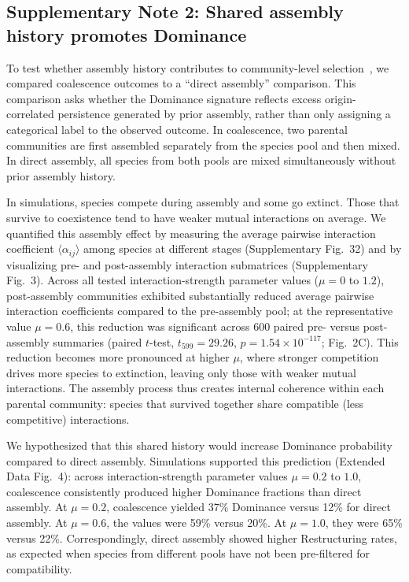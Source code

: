 \subsection*{Supplementary Note 2: Shared assembly history promotes Dominance}
\label{sec:suppl:note2}

To test whether assembly history contributes to community-level selection~\citep{Gilpin1994,Debray2022,Tikhonov2016,DiazColunga2022}, we compared coalescence outcomes to a ``direct assembly'' comparison. This comparison asks whether the Dominance signature reflects excess origin-correlated persistence generated by prior assembly, rather than only assigning a categorical label to the observed outcome. In coalescence, two parental communities are first assembled separately from the species pool and then mixed. In direct assembly, all species from both pools are mixed simultaneously without prior assembly history.

In simulations, species compete during assembly and some go extinct. Those that survive to coexistence tend to have weaker mutual interactions on average. We quantified this assembly effect by measuring the average pairwise interaction coefficient $\langle \alpha_{ij} \rangle$ among species at different stages (Supplementary Fig.~32) and by visualizing pre- and post-assembly interaction submatrices (Supplementary Fig.~3). Across all tested interaction-strength parameter values ($\mu = 0$ to $1.2$), post-assembly communities exhibited substantially reduced average pairwise interaction coefficients compared to the pre-assembly pool; at the representative value $\mu = 0.6$, this reduction was significant across 600 paired pre- versus post-assembly summaries (paired $t$-test, $t_{599} = 29.26$, $p = 1.54 \times 10^{-117}$; Fig.~2C). This reduction becomes more pronounced at higher $\mu$, where stronger competition drives more species to extinction, leaving only those with weaker mutual interactions. The assembly process thus creates internal coherence within each parental community: species that survived together share compatible (less competitive) interactions.

We hypothesized that this shared history would increase Dominance probability compared to direct assembly. Simulations supported this prediction (Extended Data Fig.~4): across interaction-strength parameter values $\mu = 0.2$ to $1.0$, coalescence consistently produced higher Dominance fractions than direct assembly. At $\mu = 0.2$, coalescence yielded 37\% Dominance versus 12\% for direct assembly. At $\mu = 0.6$, the values were 59\% versus 20\%. At $\mu = 1.0$, they were 65\% versus 22\%. Correspondingly, direct assembly showed higher Restructuring rates, as expected when species from different pools have not been pre-filtered for compatibility.

